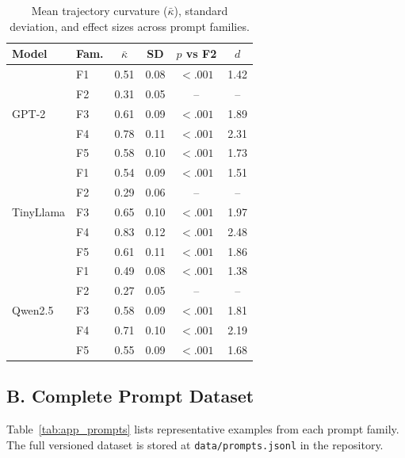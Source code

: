 \documentclass{article}
\begin{document}
\begin{table}[t]
\centering
\footnotesize
\setlength{\tabcolsep}{3pt}
\caption{Mean trajectory curvature ($\bar{\kappa}$), standard deviation, and effect sizes across prompt families.}
\label{tab:app_curvature}
\begin{tabular}{llcccc}
\toprule
Model & Fam. & $\bar{\kappa}$ & SD & $p$ vs F2 & $d$ \\
\midrule

\multirow{5}{*}{GPT-2}
& F1 & 0.51 & 0.08 & $<.001$ & 1.42 \\
& F2 & 0.31 & 0.05 & -- & -- \\
& F3 & 0.61 & 0.09 & $<.001$ & 1.89 \\
& F4 & 0.78 & 0.11 & $<.001$ & 2.31 \\
& F5 & 0.58 & 0.10 & $<.001$ & 1.73 \\

\midrule

\multirow{5}{*}{TinyLlama}
& F1 & 0.54 & 0.09 & $<.001$ & 1.51 \\
& F2 & 0.29 & 0.06 & -- & -- \\
& F3 & 0.65 & 0.10 & $<.001$ & 1.97 \\
& F4 & 0.83 & 0.12 & $<.001$ & 2.48 \\
& F5 & 0.61 & 0.11 & $<.001$ & 1.86 \\

\midrule

\multirow{5}{*}{Qwen2.5}
& F1 & 0.49 & 0.08 & $<.001$ & 1.38 \\
& F2 & 0.27 & 0.05 & -- & -- \\
& F3 & 0.58 & 0.09 & $<.001$ & 1.81 \\
& F4 & 0.71 & 0.10 & $<.001$ & 2.19 \\
& F5 & 0.55 & 0.09 & $<.001$ & 1.68 \\

\bottomrule
\end{tabular}
\end{table}
\subsection*{B. Complete Prompt Dataset}
\label{app:prompts}

Table~\ref{tab:app_prompts} lists representative examples 
from each prompt family. The full versioned dataset 
is stored at \texttt{data/prompts.jsonl} in the 
repository.
\end{document}
